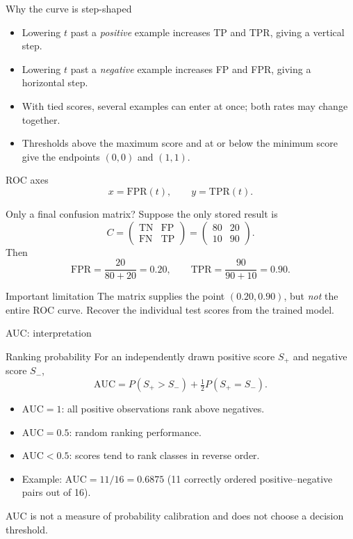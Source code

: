 \documentclass[aspectratio=169,11pt]{beamer}
\begin{document}
\begin{frame}{Why the curve is step-shaped}
\begin{itemize}
\item Lowering $t$ past a \emph{positive} example increases TP and TPR, giving a vertical step.
\item Lowering $t$ past a \emph{negative} example increases FP and FPR, giving a horizontal step.
\item With tied scores, several examples can enter at once; both rates may change together.
\item Thresholds above the maximum score and at or below the minimum score give the endpoints $(0,0)$ and $(1,1)$.
\end{itemize}
\begin{block}{ROC axes}
\[x=\mathrm{FPR}(t),\qquad y=\mathrm{TPR}(t).\]
\end{block}
\end{frame}
\begin{frame}{Only a final confusion matrix?}
Suppose the only stored result is
\[C=\begin{pmatrix}\mathrm{TN}&\mathrm{FP}\\\mathrm{FN}&\mathrm{TP}\end{pmatrix}=\begin{pmatrix}80&20\\10&90\end{pmatrix}.\]
Then
\[\mathrm{FPR}=\frac{20}{80+20}=0.20,\qquad \mathrm{TPR}=\frac{90}{90+10}=0.90.\]
\begin{alertblock}{Important limitation}
The matrix supplies the point $(0.20,0.90)$, but \emph{not} the entire ROC curve. Recover the individual test scores from the trained model.
\end{alertblock}
\end{frame}
\begin{frame}{AUC: interpretation}
\begin{block}{Ranking probability}
For an independently drawn positive score $S_+$ and negative score $S_-$,
\[\mathrm{AUC}=P(S_+>S_-)+\tfrac12P(S_+=S_-).\]
\end{block}
\begin{itemize}
\item $\mathrm{AUC}=1$: all positive observations rank above negatives.
\item $\mathrm{AUC}=0.5$: random ranking performance.
\item $\mathrm{AUC}<0.5$: scores tend to rank classes in reverse order.
\item Example: $\mathrm{AUC}=11/16=0.6875$ (11 correctly ordered positive--negative pairs out of 16).
\end{itemize}
AUC is not a measure of probability calibration and does not choose a decision threshold.
\end{frame}
\end{document}
